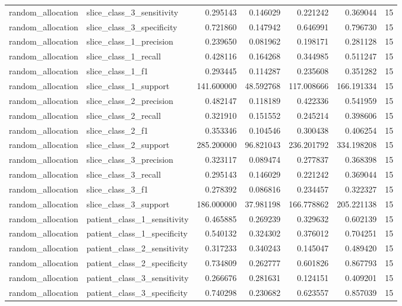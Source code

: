 \begin{tabular}{llrrrrr}
random_allocation & slice_class_3_sensitivity & 0.295143 & 0.146029 & 0.221242 & 0.369044 & 15 \\
random_allocation & slice_class_3_specificity & 0.721860 & 0.147942 & 0.646991 & 0.796730 & 15 \\
random_allocation & slice_class_1_precision & 0.239650 & 0.081962 & 0.198171 & 0.281128 & 15 \\
random_allocation & slice_class_1_recall & 0.428116 & 0.164268 & 0.344985 & 0.511247 & 15 \\
random_allocation & slice_class_1_f1 & 0.293445 & 0.114287 & 0.235608 & 0.351282 & 15 \\
random_allocation & slice_class_1_support & 141.600000 & 48.592768 & 117.008666 & 166.191334 & 15 \\
random_allocation & slice_class_2_precision & 0.482147 & 0.118189 & 0.422336 & 0.541959 & 15 \\
random_allocation & slice_class_2_recall & 0.321910 & 0.151552 & 0.245214 & 0.398606 & 15 \\
random_allocation & slice_class_2_f1 & 0.353346 & 0.104546 & 0.300438 & 0.406254 & 15 \\
random_allocation & slice_class_2_support & 285.200000 & 96.821043 & 236.201792 & 334.198208 & 15 \\
random_allocation & slice_class_3_precision & 0.323117 & 0.089474 & 0.277837 & 0.368398 & 15 \\
random_allocation & slice_class_3_recall & 0.295143 & 0.146029 & 0.221242 & 0.369044 & 15 \\
random_allocation & slice_class_3_f1 & 0.278392 & 0.086816 & 0.234457 & 0.322327 & 15 \\
random_allocation & slice_class_3_support & 186.000000 & 37.981198 & 166.778862 & 205.221138 & 15 \\
random_allocation & patient_class_1_sensitivity & 0.465885 & 0.269239 & 0.329632 & 0.602139 & 15 \\
random_allocation & patient_class_1_specificity & 0.540132 & 0.324302 & 0.376012 & 0.704251 & 15 \\
random_allocation & patient_class_2_sensitivity & 0.317233 & 0.340243 & 0.145047 & 0.489420 & 15 \\
random_allocation & patient_class_2_specificity & 0.734809 & 0.262777 & 0.601826 & 0.867793 & 15 \\
random_allocation & patient_class_3_sensitivity & 0.266676 & 0.281631 & 0.124151 & 0.409201 & 15 \\
random_allocation & patient_class_3_specificity & 0.740298 & 0.230682 & 0.623557 & 0.857039 & 15 \\

\end{tabular}
